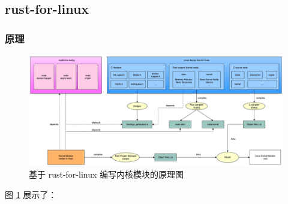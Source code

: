 \subsection{rust-for-linux}

\subsubsection{原理}

\begin{figure}[H]
  \includegraphics[width=\textwidth]{images/rust-for-linux-ability.jpg}
  \caption{基于 rust-for-linux 编写内核模块的原理图}
  \label{rust-for-linux-kernel-module-theory}
\end{figure}

图 \ref{rust-for-linux-kernel-module-theory} 展示了：

